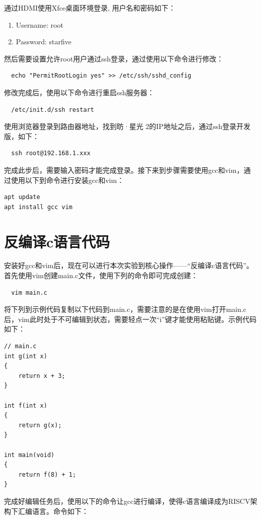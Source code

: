 \documentclass[lang=cn,10pt]{elegantbook}
\begin{document}
通过HDMI使用Xfce桌面环境登录, 用户名和密码如下：
\begin{enumerate}
\item Username: root
\item Password: starfive
\end{enumerate}

然后需要设置允许root用户通过ssh登录，通过使用以下命令进行修改：
\begin{lstlisting}
  echo "PermitRootLogin yes" >> /etc/ssh/sshd_config
\end{lstlisting}

修改完成后，使用以下命令进行重启ssh服务器：
\begin{lstlisting}
  /etc/init.d/ssh restart
\end{lstlisting}

使用浏览器登录到路由器地址，找到昉·星光 2的IP地址之后，通过ssh登录开发版，如下：

\begin{lstlisting}
  ssh root@192.168.1.xxx
\end{lstlisting}

完成此步后，需要输入密码才能完成登录。接下来到步骤需要使用gcc和vim，通过使用以下到命令进行安装gcc和vim：

\begin{lstlisting}
apt update
apt install gcc vim  
\end{lstlisting}

\section{反编译c语言代码}
安装好gcc和vim后，现在可以进行本次实验到核心操作——“反编译c语言代码”。首先使用vim创建main.c文件，使用下列的命令即可完成创建：
\begin{lstlisting}
  vim main.c  
\end{lstlisting}

将下列到示例代码复制以下代码到main.c，需要注意的是在使用vim打开main.c后，vim此时处于不可编辑到状态，需要轻点一次“i”键才能使用粘贴键。示例代码如下：

\begin{lstlisting}
// main.c
int g(int x)
{
    return x + 3;
}
    
int f(int x)
{
    return g(x);
}
    
int main(void)
{
    return f(8) + 1;
}  
\end{lstlisting}

完成好编辑任务后，使用以下的命令让gcc进行编译，使得c语言编译成为RISCV架构下汇编语言。命令如下：
\end{document}
